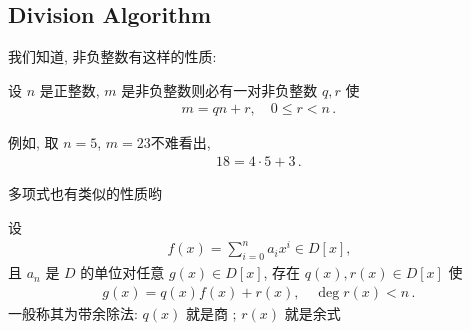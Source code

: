 \subsection*{Division Algorithm}

我们知道, 非负整数有这样的性质:

\begin{proposition}
    设 $n$ 是正整数, $m$ 是非负整数\period 则必有一对非负整数 $q,r$ 使
    \begin{align*}
        m = qn + r, \quad 0 \leq r < n \period
    \end{align*}
\end{proposition}

例如, 取 $n=5$, $m=23$\period 不难看出,
\begin{align*}
    18 = 4 \cdot 5 + 3 \period
\end{align*}

多项式也有类似的性质哟\period

\begin{proposition}
    设
    \begin{align*}
        f(x) = \sum_{i = 0}^{n} a_i x^i \in D[x],
    \end{align*}
    且 $a_n$ 是 $D$ 的单位\period 对任意 $g(x) \in D[x]$, 存在 $q(x), r(x) \in D[x]$ 使
    \begin{align*}
        g(x) = q(x) f(x) + r(x), \quad \deg r(x) < n \period
    \end{align*}
    一般称其为带余除法: $q(x)$ 就是商 ; $r(x)$ 就是余式 \period
\end{proposition}

